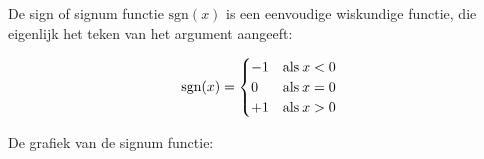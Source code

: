 De sign of signum functie $\textrm{sgn}(x)$ is een eenvoudige wiskundige
functie, die eigenlijk het teken van het argument aangeeft:

\begin{equation*}
\textrm{sgn}(x)=\begin{cases}
-1 & \textrm{als}\:x<0\\
0 & \textrm{\textrm{als}}\:x=0\\
+1 & \textrm{\textrm{als}}\:x>0
\end{cases}
\end{equation*}

De grafiek van de signum functie:



\begin{figure}[H]
	\centering
	
\end{figure}

